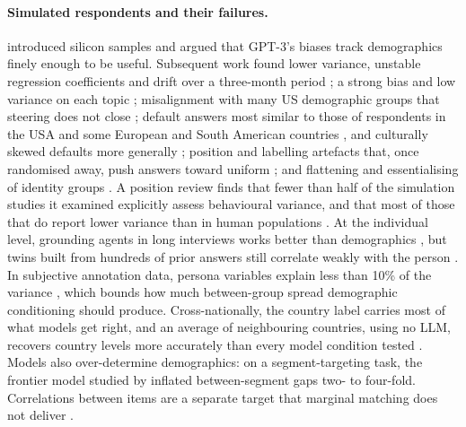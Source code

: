 \documentclass[11pt]{article}
\begin{document}
\paragraph{Simulated respondents and their failures.}
\citet{argyle2023outofone} introduced silicon samples and argued that GPT-3's biases track demographics finely enough to be useful. Subsequent work found lower variance, unstable regression coefficients and drift over a three-month period \citep{bisbee2024synthetic}; a strong bias and low variance on each topic \citep{boelaert2025machine}; misalignment with many US demographic groups that steering does not close \citep{santurkar2023whose}; default answers most similar to those of respondents in the USA and some European and South American countries \citep{durmus2023global}, and culturally skewed defaults more generally \citep{tao2024cultural}; position and labelling artefacts that, once randomised away, push answers toward uniform \citep{dominguez2024questioning}; and flattening and essentialising of identity groups \citep{wang2024flatten}. A position review finds that fewer than half of the simulation studies it examined explicitly assess behavioural variance, and that most of those that do report lower variance than in human populations \citep{wu2025boundary}. At the individual level, grounding agents in long interviews works better than demographics \citep{park2024grounded}, but twins built from hundreds of prior answers still correlate weakly with the person \citep{peng2025funhouse}. In subjective annotation data, persona variables explain less than 10\% of the variance \citep{hu2024persona}, which bounds how much between-group spread demographic conditioning should produce. Cross-nationally, the country label carries most of what models get right, and an average of neighbouring countries, using no LLM, recovers country levels more accurately than every model condition tested \citep{wang2026ess}. Models also over-determine demographics: on a segment-targeting task, the frontier model studied by \citet{chen2026synthetic} inflated between-segment gaps two- to four-fold. Correlations between items are a separate target that marginal matching does not deliver \citep{williams2026beyond}.
\end{document}
